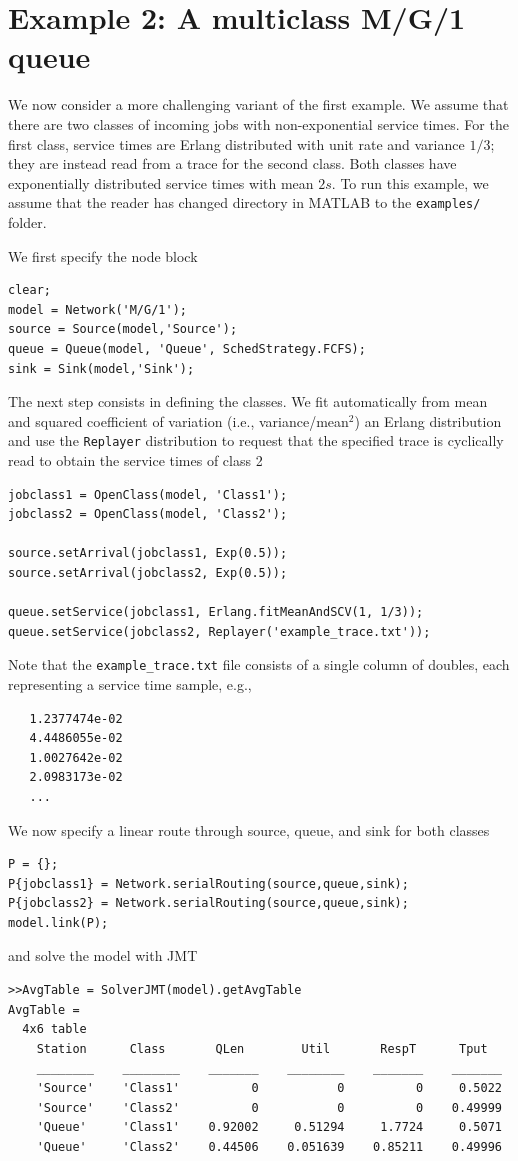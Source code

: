 \section{Example 2: A multiclass M/G/1 queue}
\label{example-2-multiclass-mgk-queue}
We now consider a more challenging variant of the first example. We assume that there are two classes of incoming jobs with non-exponential service times. For the first class, service times are Erlang distributed with unit rate and variance $1/3$; they are instead read from a trace for the second class. Both classes have exponentially distributed service times with mean $2s$. To run this example, we assume that the reader has changed directory in MATLAB to the \texttt{examples/} folder.

We first specify the node block
\begin{lstlisting}
clear;
model = Network('M/G/1');
source = Source(model,'Source');
queue = Queue(model, 'Queue', SchedStrategy.FCFS);
sink = Sink(model,'Sink');
\end{lstlisting}
The next step consists in defining the classes. We fit automatically from mean and squared coefficient of variation (i.e., variance/mean$^2$) an Erlang distribution and use the \texttt{Replayer} distribution to request that the specified trace is cyclically read to obtain the service times of class 2
\begin{lstlisting}
jobclass1 = OpenClass(model, 'Class1');
jobclass2 = OpenClass(model, 'Class2');

source.setArrival(jobclass1, Exp(0.5));
source.setArrival(jobclass2, Exp(0.5));

queue.setService(jobclass1, Erlang.fitMeanAndSCV(1, 1/3));
queue.setService(jobclass2, Replayer('example_trace.txt'));
\end{lstlisting}
Note that the \texttt{example\_trace.txt} file consists of a single column of doubles, each representing a service time sample, e.g.,
\begin{lstlisting}
   1.2377474e-02
   4.4486055e-02
   1.0027642e-02
   2.0983173e-02
   ...
\end{lstlisting}
We now specify a linear route through source, queue, and sink for both classes
\begin{lstlisting}
P = {};
P{jobclass1} = Network.serialRouting(source,queue,sink);
P{jobclass2} = Network.serialRouting(source,queue,sink);
model.link(P);
\end{lstlisting}
and solve the model with JMT
\begin{lstlisting}
>>AvgTable = SolverJMT(model).getAvgTable
AvgTable =
  4x6 table
    Station      Class       QLen        Util       RespT      Tput
    ________    ________    _______    ________    _______    _______
    'Source'    'Class1'          0           0          0     0.5022
    'Source'    'Class2'          0           0          0    0.49999
    'Queue'     'Class1'    0.92002     0.51294     1.7724     0.5071
    'Queue'     'Class2'    0.44506    0.051639    0.85211    0.49996
\end{lstlisting}
